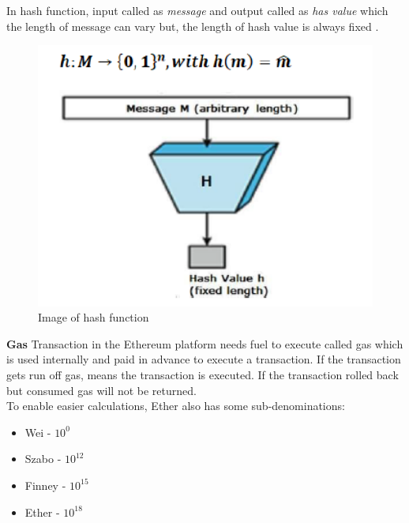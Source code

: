 In hash function, input called as \textit{message} and output called as  \textit{has value} which the length of message can vary but, the length of hash value is always fixed \cite{fips}.\\
\begin{center}
	\begin{figure}[htb!]
		
		\begin{minipage}{0.5\linewidth}
			\centering
			\includegraphics[width=1.95\textwidth]{images/chap01_hash_function.png}
		\end{minipage}
		\caption[Image of hash function]{Image of hash function}
		
	\end{figure}
	
\end{center}
\textbf{Gas} Transaction in the Ethereum platform needs fuel to execute called gas which is used internally and paid in advance to execute a transaction. If the transaction gets run off gas, means the transaction is executed. If the transaction rolled back but consumed gas will not be returned.\\
To enable easier calculations, Ether also has some sub-denominations\cite{Egbertsen}:\\
\begin{itemize}
	\item Wei - $10^0$
	\item Szabo - $10^12$
	\item Finney - $10^15$
	\item Ether - $10^18$
\end{itemize}
